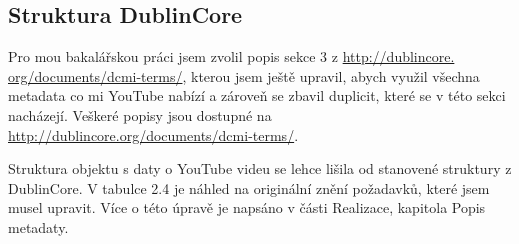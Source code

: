 \subsection{Struktura DublinCore}
\par Pro mou bakalářskou práci jsem zvolil popis sekce 3 z \url{http://dublincore.}\\\url{org/documents/dcmi-terms/}, kterou jsem ještě upravil, abych využil všechna metadata co mi YouTube nabízí a zároveň se zbavil duplicit, které se v této sekci nacházejí. Veškeré popisy jsou dostupné na \url{http://dublincore.org/documents/dcmi-terms/}.
\par Struktura objektu s daty o YouTube videu se lehce lišila od stanovené struktury z DublinCore\cite{dublincoredocementation}. V tabulce 2.4 je náhled na originální znění požadavků, které jsem musel upravit. Více o této úpravě je napsáno v části Realizace, kapitola Popis metadaty.
\vfill
